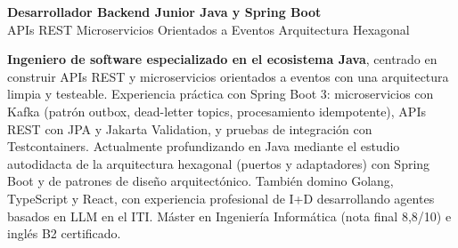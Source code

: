 \documentclass[11pt,a4paper,sans]{moderncv}
\begin{document}
\makecvtitle

\vspace{-4pt}
\begin{center}
{\Large\bfseries\color{color1}Desarrollador Backend Junior \textbar{} Java y Spring Boot}\\[3pt]
{\normalsize\color{color2}APIs REST \textbullet{} Microservicios Orientados a Eventos \textbullet{} Arquitectura Hexagonal}
\end{center}


\vspace{2pt}
\small{\textbf{Ingeniero de software especializado en el ecosistema Java}, centrado en construir APIs REST y microservicios orientados a eventos con una arquitectura limpia y testeable. Experiencia práctica con Spring Boot 3: microservicios con Kafka (patrón outbox, dead-letter topics, procesamiento idempotente), APIs REST con JPA y Jakarta Validation, y pruebas de integración con Testcontainers. Actualmente profundizando en Java mediante el estudio autodidacta de la arquitectura hexagonal (puertos y adaptadores) con Spring Boot y de patrones de diseño arquitectónico. También domino Golang, TypeScript y React, con experiencia profesional de I+D desarrollando agentes basados en LLM en el ITI. Máster en Ingeniería Informática (nota final 8,8/10) e inglés B2 certificado.}

\end{document}
